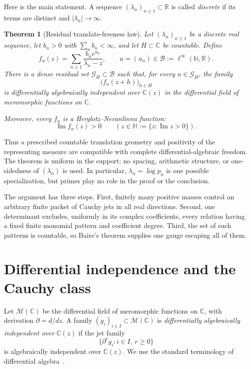 \documentclass[11pt]{article}
\newtheorem{theorem}{Theorem}[section]
\newcommand{\C}{\mathbb C}
\newcommand{\R}{\mathbb R}
\newcommand{\N}{\mathbb N}
\newcommand{\HH}{\mathbb H}
\newcommand{\cB}{\mathcal B}
\newcommand{\cG}{\mathcal G}
\newcommand{\cM}{\mathcal M}
\newcommand{\im}{\operatorname{Im}}
\newcommand{\D}{\partial}
\begin{document}
Here is the main statement.  A sequence $(\lambda_n)_{n\geq1}\subset\R$ is called
\emph{discrete} if its terms are distinct and $|\lambda_n|\to\infty$.

\begin{theorem}[Residual translate-freeness law]\label{thm:main}
Let $(\lambda_n)_{n\geq1}$ be a discrete real sequence, let $b_n>0$ with
$\sum_n b_n<\infty$, and let $H\subset\C$ be countable.  Define
\begin{equation}\label{eq:source}
  f_u(z)=\sum_{n\geq1}\frac{b_ne^{u_n}}{\lambda_n-z},
  \qquad u=(u_n)\in\cB:=\ell^\infty(\N,\R).
\end{equation}
There is a dense residual set $\cG_H\subset\cB$ such that, for every $u\in\cG_H$, the family
\begin{equation}\label{eq:translate-family}
  \bigl(f_u(z+h)\bigr)_{h\in H}
\end{equation}
is differentially algebraically independent over $\C(z)$ in the differential field of
meromorphic functions on $\C$.

Moreover, every $f_u$ is a Herglotz--Nevanlinna function:
\begin{equation}\label{eq:herglotz}
  \im f_u(z)>0\qquad(z\in\HH:=\{z:\im z>0\}).
\end{equation}
\end{theorem}

Thus a prescribed countable translation geometry and positivity of the representing measure are
compatible with complete differential-algebraic freedom.  The theorem is uniform in the support:
no spacing, arithmetic structure, or one-sidedness of $(\lambda_n)$ is used.  In particular,
$\lambda_n=\log p_n$ is one possible specialization, but primes play no role in the proof or the
conclusion.

The argument has three steps.  First, finitely many positive masses control an arbitrary finite
packet of Cauchy jets in all real directions.  Second, one determinant excludes, uniformly in
its complex coefficients, every relation having a fixed finite monomial pattern and coefficient
degree.  Third, the set of such patterns is countable, so Baire's theorem supplies one gauge
escaping all of them.

\section{Differential independence and the Cauchy class}

Let $\cM(\C)$ be the differential field of meromorphic functions on $\C$, with derivation
$\D=d/dz$.  A family $(g_i)_{i\in I}\subset\cM(\C)$ is \emph{differentially algebraically
independent over $\C(z)$} if the jet family
\[
  \{\D^rg_i:i\in I,\ r\geq0\}
\]
is algebraically independent over $\C(z)$.  We use the standard terminology of differential
algebra~\cite{Kolchin1973}.
\end{document}
